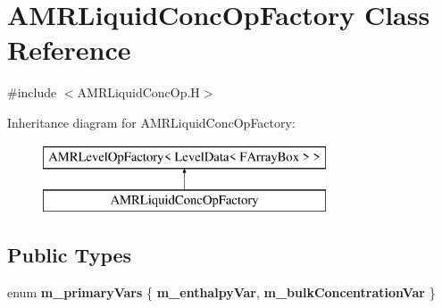 \hypertarget{class_a_m_r_liquid_conc_op_factory}{\section{A\-M\-R\-Liquid\-Conc\-Op\-Factory Class Reference}
\label{class_a_m_r_liquid_conc_op_factory}
}


{\ttfamily \#include $<$A\-M\-R\-Liquid\-Conc\-Op.\-H$>$}

Inheritance diagram for A\-M\-R\-Liquid\-Conc\-Op\-Factory\-:\begin{figure}[H]
\begin{center}
\leavevmode
\includegraphics[height=2.000000cm]{class_a_m_r_liquid_conc_op_factory}
\end{center}
\end{figure}
\subsection*{Public Types}
\begin{DoxyCompactItemize}
\item 
enum {\bfseries m\-\_\-primary\-Vars} \{ {\bfseries m\-\_\-enthalpy\-Var}, 
{\bfseries m\-\_\-bulk\-Concentration\-Var}
 \}
\end{DoxyCompactItemize}
